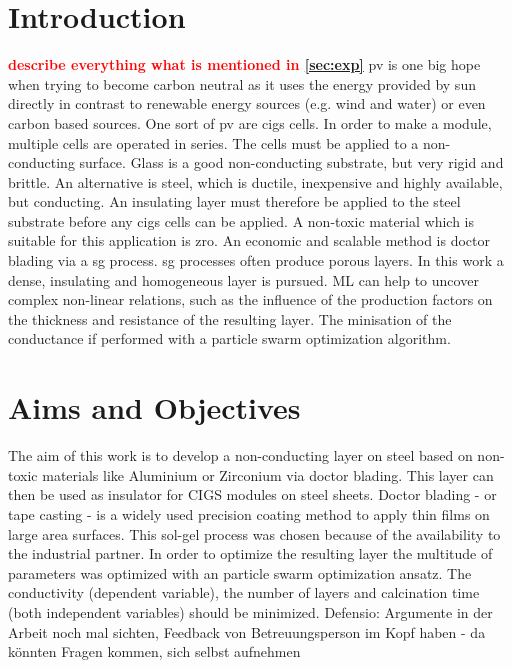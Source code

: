 \documentclass[a4paper]{article}
\newcommand{\td}[1]{\textbf{\textcolor{red}{#1}}}
\begin{document}
\section{Introduction}
\td{describe everything what is mentioned in \ref{sec:exp}}
\Gls{pv} is one big hope when trying to become carbon neutral as it uses the energy provided by sun directly in contrast to renewable energy sources (e.g. wind and water) or even carbon based sources.
One sort of \gls{pv} are \gls{cigs} \cite{Vasekar2010} cells. %
In order to make a module, multiple cells are operated in series. 
The cells must be applied to a non-conducting surface.
Glass is a good non-conducting substrate, but very rigid and brittle. 
An alternative is steel, which is ductile, inexpensive and highly available, but conducting. 
An insulating layer must therefore be applied to the steel substrate before any \gls{cigs} cells can be applied.
A non-toxic material which is suitable for this application is \gls{zro}. 
An economic and scalable method is doctor blading via a \gls{sg} process. 
\gls{sg} processes often produce porous layers. 
In this work a dense, insulating and homogeneous layer is pursued. 
ML can help to uncover complex non-linear relations, such as the influence of the production factors on the thickness and resistance of the resulting layer.
The minisation of the conductance if performed with a particle swarm optimization algorithm.
\section{Aims and Objectives}
The aim of this work is to develop a non-conducting layer on steel based on  non-toxic materials like Aluminium or Zirconium via doctor blading. 
This layer can then be used as insulator for CIGS modules on steel sheets.
Doctor blading - or tape casting - is a widely used precision coating method to apply thin films on large area surfaces\cite{Berni2004}.
This sol-gel process was chosen because of the availability to the industrial partner.
In order to optimize the resulting layer the multitude of parameters was optimized with an particle swarm optimization ansatz. %
The conductivity (dependent variable), the number of layers and calcination time (both independent variables) should be minimized.
\iffalse
Defensio: Argumente in der Arbeit noch mal sichten, Feedback von Betreuungsperson im Kopf haben - da könnten Fragen kommen, 
sich selbst aufnehmen 
\end{document}

